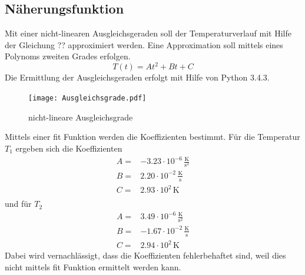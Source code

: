 \subsection{Näherungsfunktion}
Mit einer nicht-linearen Ausgleichsgeraden soll der Temperaturverlauf mit Hilfe der Gleichung ?? approximiert werden. Eine Approximation soll mittels eines Polynoms zweiten Grades erfolgen.
\begin{equation}
  T(t) = At^2 + Bt +C
  \label{eqn:ausgleichsgrade}
\end{equation}
Die Ermittlung der Ausgleichsgeraden erfolgt mit Hilfe von Python 3.4.3.
\begin{figure}
  \centering
  \texttt{[image: Ausgleichsgrade.pdf]}
  \caption{nicht-lineare Ausgleichsgrade}
  \label{fig:ausg}
\end{figure}
Mittels einer fit Funktion werden die Koeffizienten bestimmt. Für die Temperatur $T_\text{1}$ ergeben sich die Koeffizienten
\begin{eqnarray}
  A =& -3.23 \cdot 10^{-6} \, \frac{\text{K}}{\text{s}^2}	\\
  B =& 2.20 \cdot 10^{-2} \, \frac{\text{K}}{\text{s}} 	\\
  C =& 2.93 \cdot 10^{2} \, \text{K} \\
  \label{eqn:koefT1}
\end{eqnarray}
und für $T_\text{2}$
\begin{eqnarray}
  A =& 3.49 \cdot 10^{-6} \, \frac{\text{K}}{\text{s}^2} 	\\
  B =& -1.67 \cdot 10^{-2} \, \frac{\text{K}}{\text{s}} 	\\
  C =& 2.94 \cdot 10^2 \, \text{K}
  \label{eqn:koefT2}
\end{eqnarray}
Dabei wird vernachlässigt, dass die Koeffizienten fehlerbehaftet sind, weil dies nicht mittels fit Funktion ermittelt werden kann.
